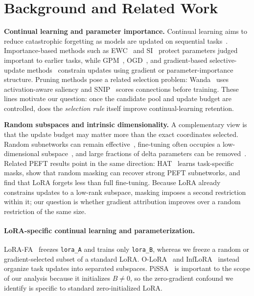 \section{Background and Related Work}
\label{sec:background}

\textbf{Continual learning and parameter importance.}
Continual learning aims to reduce catastrophic forgetting as models are updated on sequential tasks~\citep{mccloskey1989catastrophic,french1999catastrophic}. Importance-based methods such as EWC~\citep{kirkpatrick2017overcoming} and SI~\citep{zenke2017continual} protect parameters judged important to earlier tasks, while GPM~\citep{saha2021gpm}, OGD~\citep{farajtabar2020ogd}, and gradient-based selective-update methods~\citep{qiao2024pegp,wang2025gorp} constrain updates using gradient or parameter-importance structure. Pruning methods pose a related selection problem: Wanda~\citep{sun2024wanda} uses activation-aware saliency and SNIP~\citep{lee2019snip} scores connections before training. These lines motivate our question: once the candidate pool and update budget are controlled, does the \emph{selection rule} itself improve continual-learning retention.

\textbf{Random subspaces and intrinsic dimensionality.}
A complementary view is that the update budget may matter more than the exact coordinates selected. Random subnetworks can remain effective~\citep{frankle2019lottery,ramanujan2020whats}, fine-tuning often occupies a low-dimensional subspace~\citep{aghajanyan2020intrinsic}, and large fractions of delta parameters can be removed~\citep{yu2024dare}. Related PEFT results point in the same direction: HAT~\citep{serra2018hat} learns task-specific masks, \citet{su2024random} show that random masking can recover strong PEFT subnetworks, and \citet{biderman2024lora} find that LoRA forgets less than full fine-tuning. Because LoRA already constrains updates to a low-rank subspace, masking imposes a second restriction within it; our question is whether gradient attribution improves over a random restriction of the same size.

\paragraph{LoRA-specific continual learning and parameterization.}
LoRA-FA~\citep{zhang2023lorafa} freezes \texttt{lora\_A} and trains only \texttt{lora\_B}, whereas we freeze a random or gradient-selected subset of a standard LoRA. O-LoRA~\citep{wang2023olora} and InfLoRA~\citep{liang2024inflora} instead organize task updates into separated subspaces. PiSSA~\citep{meng2024pissa} is important to the scope of our analysis because it initializes $B\neq0$, so the zero-gradient confound we identify is specific to standard zero-initialized LoRA.

